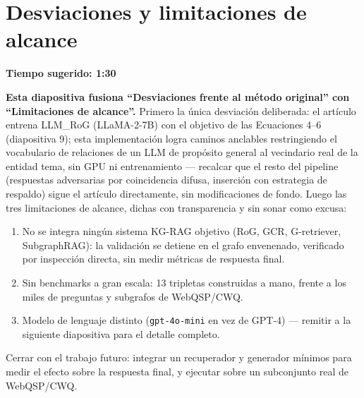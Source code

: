 \documentclass[11pt]{article}
\newcommand{\tiempo}[1]{{\small\color{timecolor}\textbf{Tiempo sugerido: #1}}\par\vspace{0.3em}}
\begin{document}
\section{Desviaciones y limitaciones de alcance}
\tiempo{1:30}
\textbf{Esta diapositiva fusiona ``Desviaciones frente al método original'' con
``Limitaciones de alcance''.} Primero la única desviación deliberada: el artículo entrena
LLM\_RoG (LLaMA-2-7B) con el objetivo de las Ecuaciones 4--6 (diapositiva 9); esta
implementación logra caminos anclables restringiendo el vocabulario de relaciones de un LLM
de propósito general al vecindario real de la entidad tema, sin GPU ni entrenamiento ---
recalcar que el resto del pipeline (respuestas adversarias por coincidencia difusa,
inserción con estrategia de respaldo) sigue el artículo directamente, sin modificaciones de
fondo. Luego las tres limitaciones de alcance, dichas con transparencia y sin sonar como
excusa:
\begin{enumerate}
  \item No se integra ningún sistema KG-RAG objetivo (RoG, GCR, G-retriever, SubgraphRAG):
    la validación se detiene en el grafo envenenado, verificado por inspección directa, sin
    medir métricas de respuesta final.
  \item Sin benchmarks a gran escala: 13 tripletas construidas a mano, frente a los miles de
    preguntas y subgrafos de WebQSP/CWQ.
  \item Modelo de lenguaje distinto (\texttt{gpt-4o-mini} en vez de GPT-4) --- remitir a la
    siguiente diapositiva para el detalle completo.
\end{enumerate}
Cerrar con el trabajo futuro: integrar un recuperador y generador mínimos para medir el
efecto sobre la respuesta final, y ejecutar sobre un subconjunto real de WebQSP/CWQ.

\end{document}
